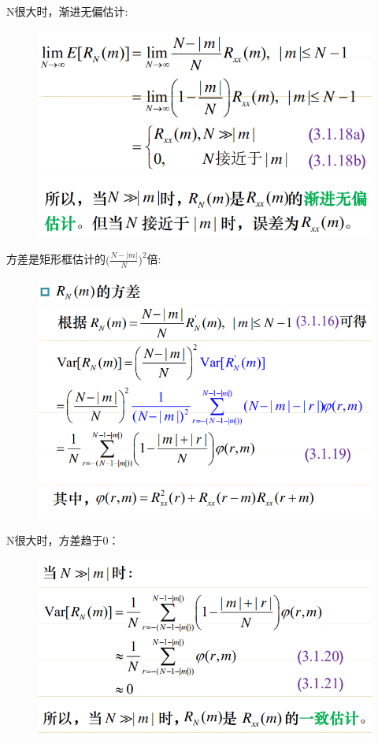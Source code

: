 \documentclass[UTF8]{ctexart} %
\begin{document}
				N很大时，渐进无偏估计:
				\begin{figure}[H]
					\centering\includegraphics[scale=0.4]{88.png}
				\end{figure}
				方差是矩形框估计的$\Big(\frac{N-|m|}{N}\Big)^2$倍:
				\begin{figure}[H]
					\centering\includegraphics[scale=0.4]{89.png}
				\end{figure}
				N很大时，方差趋于0：
				\begin{figure}[H]
					\centering\includegraphics[scale=0.4]{90.png}
				\end{figure}
\end{document}
